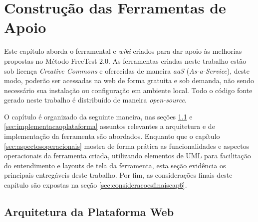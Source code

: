\chapter{Construção das Ferramentas de Apoio}
\label{sec:ferramentas}

Este capítulo aborda o ferramental e \textit{wiki} criados para dar apoio às melhorias propostas no Método FreeTest 2.0. As ferramentas criadas neste trabalho estão sob licença \textit{Creative Commons} e oferecidas de maneira \textit{aaS} (\textit{As-a-Service}), deste modo, poderão ser acessadas na web de forma gratuita e sob demanda, não sendo necessário sua instalação ou configuração em ambiente local. Todo o código fonte gerado neste trabalho é distribuído de maneira \textit{open-source}. 

O capítulo é organizado da seguinte maneira, nas seções \ref{sec:arquiteturaplataforma} e \ref{sec:implementacaoplataforma} assuntos relevantes a arquitetura e de implementação da ferramenta são abordados. Enquanto que o capítulo \ref{sec:aspectosoperacionais} mostra de forma prática as funcionalidades e aspectos operacionais da ferramenta criada, utilizando elementos de UML para facilitação do entendimento e layouts de tela da ferramenta, esta seção evidência os principais entregáveis deste trabalho. Por fim, as considerações finais deste capítulo são expostas na seção \ref{sec:consideracoesfinaiscap6}.

\section{Arquitetura da Plataforma Web}
\label{sec:arquiteturaplataforma}

